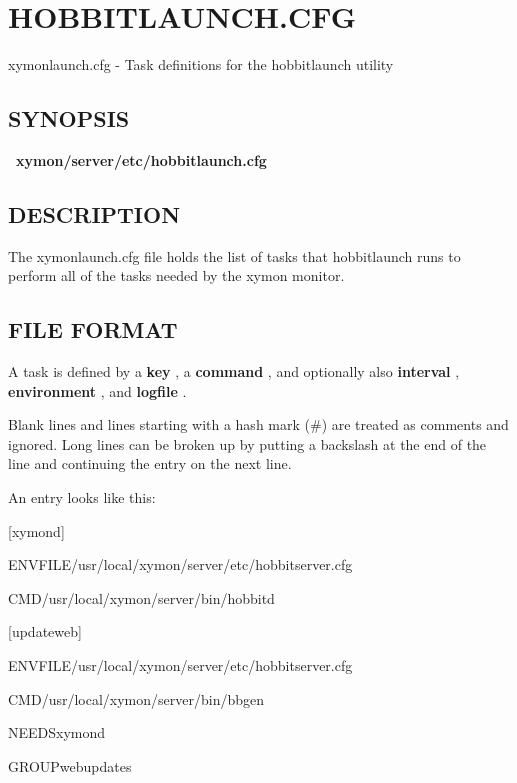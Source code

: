 %
\newpage
\section{HOBBITLAUNCH.CFG}

 xymonlaunch.cfg - Task definitions for the hobbitlaunch utility 

 
\subsection{SYNOPSIS}
\textbf{~xymon/server/etc/hobbitlaunch.cfg}


 
\subsection{DESCRIPTION}
 The xymonlaunch.cfg file holds the list of tasks that hobbitlaunch
 runs to perform all of the tasks needed by the xymon monitor. 


 
\subsection{FILE FORMAT}
 A task is defined by a \textbf{key}
, a \textbf{command}
, and optionally also \textbf{interval}
, \textbf{environment}
, and \textbf{logfile}
. 

  Blank lines and lines starting with a hash mark (\#) are treated as
  comments and ignored. Long lines can be broken up by putting a
  backslash at the end of the line and continuing the entry on the
  next line. 



  An entry looks like this: 


  
[xymond]  
 
ENVFILE/usr/local/xymon/server/etc/hobbitserver.cfg  
 
CMD/usr/local/xymon/server/bin/hobbitd 


  
[updateweb]  
 
ENVFILE/usr/local/xymon/server/etc/hobbitserver.cfg  
 
CMD/usr/local/xymon/server/bin/bbgen  
 
NEEDSxymond  
 
GROUPwebupdates  
 
